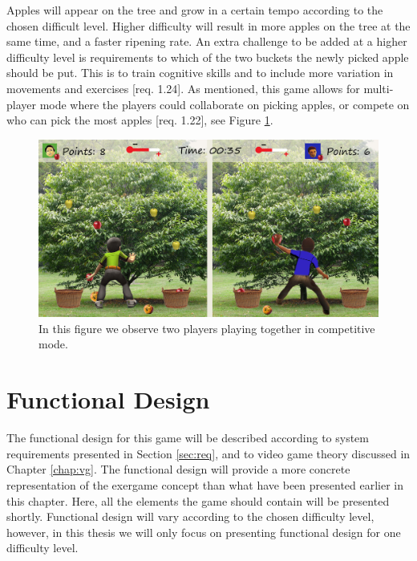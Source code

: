 Apples will appear on the tree and grow in a certain tempo according to the chosen difficult level. Higher difficulty will result in more apples on the tree at the same time, and a faster ripening rate. An extra challenge to be added at a higher difficulty level is requirements to which of the two buckets the newly picked apple should be put. This is to train cognitive skills and to include more variation in movements and exercises [req. 1.24]. As mentioned, this game allows for multi-player mode where the players could collaborate on picking apples, or compete on who can pick the most apples [req. 1.22], see Figure \ref{fig:appleMultiplayer}. 

\begin{figure} [H]
\centering
\includegraphics[scale=0.075]{gameapple2playerEngelsk.jpg}
\caption[Picking apples - multi-player]{In this figure we observe two players playing together in competitive mode.}
\label{fig:appleMultiplayer}
\end{figure}

\section{Functional Design}
\label{sec:functionaldesign}

The functional design for this game will be described according to system requirements presented in Section \ref{sec:req}, and to video game theory discussed in Chapter \ref{chap:vg}. The functional design will provide a more concrete representation of the exergame concept than what have been presented earlier in this chapter. Here, all the elements the game should contain will be presented shortly. Functional design will vary according to the chosen difficulty level, however, in this thesis we will only focus on presenting functional design for one difficulty level.

